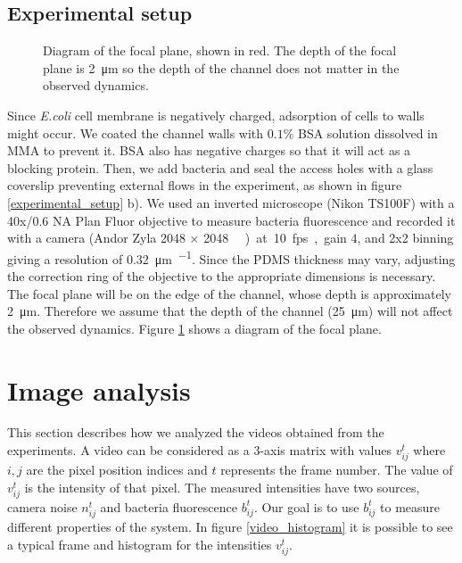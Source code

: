 \subsection{Experimental setup}

\begin{figure}
\centering

\caption[Focal plane diagram]{Diagram of the focal plane, shown in red. The depth of the focal plane is \SI{2}{\micro\meter} so the depth of the channel does not matter in the observed dynamics. }
\label{focal_plane}
\end{figure}

Since \textit{E.coli} cell membrane is negatively charged, adsorption of cells to walls might occur. We coated the channel walls with $0.1\%$ BSA solution dissolved in MMA to prevent it. BSA also has negative charges so that it will act as a blocking protein. Then, we add bacteria and seal the access holes with a glass coverslip preventing external flows in the experiment, as shown in figure \ref{experimental_setup} b). We used an inverted microscope (Nikon TS100F) with a 40x/0.6 NA Plan Fluor objective to measure bacteria fluorescence and recorded it with a camera (Andor Zyla 2048 × 2048 \SI{}{\square\pixels}) at 10 fps, gain $4$, and 2x2 binning giving a resolution of \SI[per-mode = symbol]{0.32}{\micro\meter\per\pixels}. Since the PDMS thickness may vary, adjusting the correction ring of the objective to the appropriate dimensions is necessary. The focal plane will be on the edge of the channel, whose depth is approximately \SI{2}{\micro\meter}. Therefore we assume that the depth of the channel (\SI{25}{\micro\meter}) will not affect the observed dynamics. Figure \ref{focal_plane} shows a diagram of the focal plane. 


\section{Image analysis}


This section describes how we analyzed the videos obtained from the experiments. A video can be considered as a 3-axis matrix with values $v_{ij}^t$ where $i,j$ are the pixel position indices and $t$ represents the frame number. The value of $v_{ij}^t$ is the intensity of that pixel. The measured intensities have two sources, camera noise $n_{ij}^t$ and bacteria fluorescence $b_{ij}^t$. Our goal is to use $b_{ij}^t$ to measure different properties of the system. In figure \ref{video_histogram} it is possible to see a typical frame and histogram for the intensities $v_{ij}^t$.

